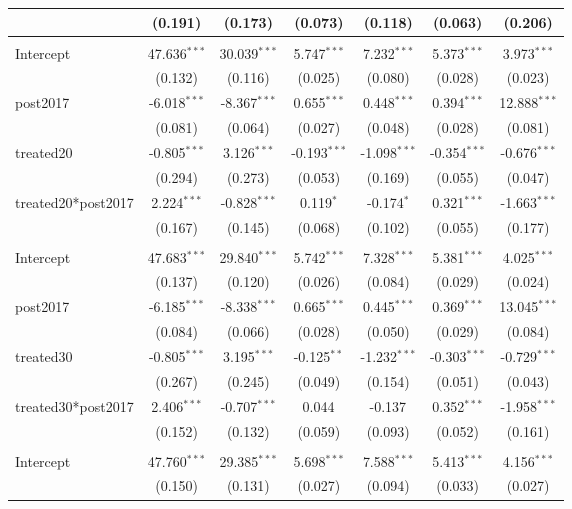 \documentclass[12pt]{article}
\begin{document}
\begin{table}[!htbp]
\begin{tabular}{@{\extracolsep{5pt}}lcccccc}
  & (0.191) & (0.173) & (0.073) & (0.118) & (0.063) & (0.206) \\
\hline \\[-1.8ex]
 Intercept & 47.636$^{***}$ & 30.039$^{***}$ & 5.747$^{***}$ & 7.232$^{***}$ & 5.373$^{***}$ & 3.973$^{***}$ \\
  & (0.132) & (0.116) & (0.025) & (0.080) & (0.028) & (0.023) \\
 post2017 & -6.018$^{***}$ & -8.367$^{***}$ & 0.655$^{***}$ & 0.448$^{***}$ & 0.394$^{***}$ & 12.888$^{***}$ \\
  & (0.081) & (0.064) & (0.027) & (0.048) & (0.028) & (0.081) \\
 treated20 & -0.805$^{***}$ & 3.126$^{***}$ & -0.193$^{***}$ & -1.098$^{***}$ & -0.354$^{***}$ & -0.676$^{***}$ \\
  & (0.294) & (0.273) & (0.053) & (0.169) & (0.055) & (0.047) \\
 treated20*post2017 & 2.224$^{***}$ & -0.828$^{***}$ & 0.119$^{*}$ & -0.174$^{*}$ & 0.321$^{***}$ & -1.663$^{***}$ \\
  & (0.167) & (0.145) & (0.068) & (0.102) & (0.055) & (0.177) \\
\hline \\[-1.8ex]
 Intercept & 47.683$^{***}$ & 29.840$^{***}$ & 5.742$^{***}$ & 7.328$^{***}$ & 5.381$^{***}$ & 4.025$^{***}$ \\
  & (0.137) & (0.120) & (0.026) & (0.084) & (0.029) & (0.024) \\
 post2017 & -6.185$^{***}$ & -8.338$^{***}$ & 0.665$^{***}$ & 0.445$^{***}$ & 0.369$^{***}$ & 13.045$^{***}$ \\
  & (0.084) & (0.066) & (0.028) & (0.050) & (0.029) & (0.084) \\
 treated30 & -0.805$^{***}$ & 3.195$^{***}$ & -0.125$^{**}$ & -1.232$^{***}$ & -0.303$^{***}$ & -0.729$^{***}$ \\
  & (0.267) & (0.245) & (0.049) & (0.154) & (0.051) & (0.043) \\
 treated30*post2017 & 2.406$^{***}$ & -0.707$^{***}$ & 0.044$^{}$ & -0.137$^{}$ & 0.352$^{***}$ & -1.958$^{***}$ \\
  & (0.152) & (0.132) & (0.059) & (0.093) & (0.052) & (0.161) \\
\hline \\[-1.8ex]
 Intercept & 47.760$^{***}$ & 29.385$^{***}$ & 5.698$^{***}$ & 7.588$^{***}$ & 5.413$^{***}$ & 4.156$^{***}$ \\
  & (0.150) & (0.131) & (0.027) & (0.094) & (0.033) & (0.027) \\

\end{tabular}
\end{table}
\end{document}
